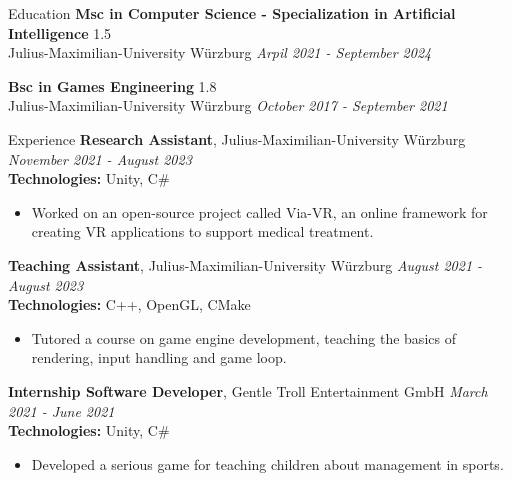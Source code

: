 \documentclass{resume} %
\begin{document}
\begin{rSection}{Education}
{\bf Msc in Computer Science - Specialization in Artificial Intelligence} \hfill {1.5} 
\\ Julius-Maximilian-University Würzburg \hfill {\em Arpil 2021 - September 2024}

{\bf Bsc in Games Engineering} \hfill {1.8} 
\\ Julius-Maximilian-University Würzburg \hfill {\em October 2017 - September 2021}
\end{rSection}

\begin{rSection}{Experience}
{\bf Research Assistant}{, Julius-Maximilian-University Würzburg} \hfill {\em November 2021 - August 2023}\\
{\bf Technologies:} Unity, C\# 
\begin{itemize}
    \item Worked on an open-source project called Via-VR, an online framework for creating VR applications to support medical treatment.
\end{itemize}
{\bf Teaching Assistant}{, Julius-Maximilian-University Würzburg} \hfill {\em August 2021 - August 2023}\\
{\bf Technologies:} C++, OpenGL, CMake
\begin{itemize}
    \item Tutored a course on game engine development, teaching the basics of rendering, input handling and game loop.
\end{itemize}
{\bf Internship Software Developer}{, Gentle Troll Entertainment GmbH} \hfill {\em March 2021 - June 2021}\\
{\bf Technologies:} Unity, C\#
\begin{itemize}
    \item Developed a serious game for teaching children about management in sports.
\end{itemize}
\end{rSection}
\end{document}
